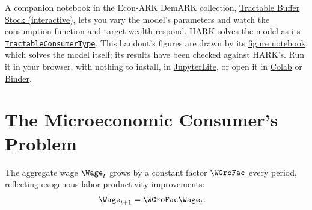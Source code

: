 \documentclass{econark}
\begin{document}
A companion notebook in the Econ-ARK DemARK collection, \href{https://econ-ark.org/materials/tractablebufferstock-interactive}{Tractable Buffer Stock (interactive)}, lets you vary the model's parameters and watch the consumption function and target wealth respond. HARK solves the model as its \texttt{\href{https://github.com/econ-ark/HARK/blob/main/examples/TractableBufferStockModel/TractableConsumerType.ipynb}{TractableConsumerType}}.  This handout's figures are drawn by its \href{https://github.com/llorracc/TractableBufferStock/blob/main/TractableBufferStock.ipynb}{figure notebook}, which solves the model itself; its results have been checked against HARK's.  Run it in your browser, with nothing to install, in \href{https://intertemporal-choice.github.io/lite/notebooks/index.html?path=TractableBufferStock.ipynb}{JupyterLite}, or open it in \href{https://colab.research.google.com/github/llorracc/TractableBufferStock/blob/main/TractableBufferStock.ipynb}{Colab} or \href{https://mybinder.org/v2/gh/llorracc/TractableBufferStock/main?labpath=TractableBufferStock.ipynb}{Binder}.

\section{The Microeconomic Consumer's Problem}
The aggregate wage $\Wage_{t}$ grows by a constant factor $\WGroFac$ every period, reflecting exogenous labor productivity improvements:
\begin{equation}\begin{gathered}\begin{aligned}
        \Wage_{t+1} & =  \WGroFac \Wage_{t}.
\end{aligned}\end{gathered}\end{equation}
\end{document}
